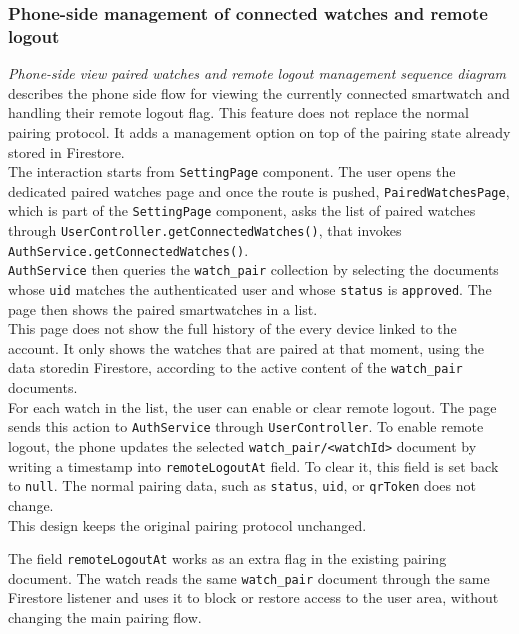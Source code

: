 \subsubsection{Phone-side management of connected watches and remote logout}

\textit{Phone-side view paired watches and remote logout management sequence diagram} describes the phone side flow for viewing the currently connected smartwatch and handling their remote logout flag. This feature does not replace the normal pairing protocol. It adds a management option on top of the pairing state already stored in Firestore. \\
The interaction starts from \texttt{SettingPage} component. The user opens the dedicated paired watches page and once the route is pushed, \texttt{PairedWatchesPage}, which is part of the \texttt{SettingPage} component, asks the list of paired watches through \texttt{UserController.getConnectedWatches()}, that invokes \texttt{AuthService.getConnectedWatches()}. \\ \texttt{AuthService} then queries the \texttt{watch\_pair} collection by selecting the documents whose \texttt{uid} matches the authenticated user and whose \texttt{status} is \texttt{approved}. The page then shows the paired smartwatches in a list. \\

This page does not show the full history of the every device linked to the account. It only shows the watches that are paired at that moment, using the data storedin Firestore, according to the active content of the \texttt{watch\_pair} documents. \\

For each watch in the list, the user can enable or clear remote logout. The page sends this action to \texttt{AuthService} through \texttt{UserController}. To enable remote logout, the phone updates the selected \texttt{watch\_pair/<watchId>} document by writing a timestamp into  \texttt{remoteLogoutAt} field. To clear it, this field is set back to \texttt{null}. The normal pairing data, such as \texttt{status}, \texttt{uid}, or \texttt{qrToken} does not change. \\
This design keeps the original pairing protocol unchanged. 

The field \texttt{remoteLogoutAt} works as an extra flag in the existing pairing document. The watch reads the same \texttt{watch\_pair} document through the same Firestore listener and uses it to block or restore access to the user area, without changing the main pairing flow.\\


